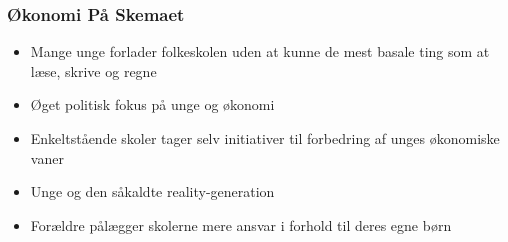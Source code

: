 
\begin{frame}
\frametitle{Økonomi På Skemaet}
    \begin{itemize}
        \item{Mange unge forlader folkeskolen uden at kunne de mest basale ting som at læse, skrive og regne}

        \item{Øget politisk fokus på unge og økonomi}

        \item{Enkeltstående skoler tager selv initiativer til forbedring af unges økonomiske vaner}

        \item{Unge og den såkaldte reality-generation}

        \item{Forældre pålægger skolerne mere ansvar i forhold til deres egne børn}
    \end{itemize}
\end{frame}
    
